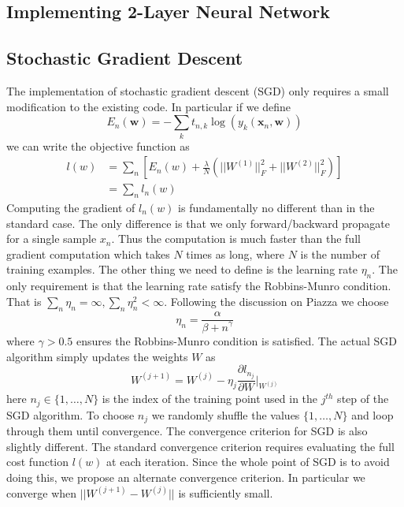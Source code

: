 \documentclass[10pt]{article}
\begin{document}
\subsection*{Implementing 2-Layer Neural Network}

\subsection*{Stochastic Gradient Descent}
The implementation of stochastic gradient descent (SGD) only requires a small modification to the existing code. In particular if we define
%
%
\begin{equation}
E_n(\mathbf{w}) = -\sum_k t_{n,k} \log(y_k(\mathbf{x}_n,\mathbf{w}))
\end{equation}
%
we can write the objective function as 
%
%
\begin{align}
l(w) &= \sum_n \left[ E_n(w) + \frac{\lambda}{N} (||W^{(1)}||^2_F + ||W^{(2)}||^2_F) \right] \\
& = \sum_n l_n(w)
\end{align}
%
%
Computing the gradient of $l_n(w)$ is fundamentally no different than in the standard case. The only difference is that we only forward/backward propagate for a single sample $x_n$. Thus the computation is much faster than the full gradient computation which takes $N$ times as long, where $N$ is the number of training examples. The other thing we need to define is the learning rate $\eta_n$. The only requirement is that the learning rate satisfy the Robbins-Munro condition. That is $\sum_n \eta_n = \infty, \sum_n \eta_n^2 < \infty$. Following the discussion on Piazza we choose
%
%
\begin{equation}
\eta_n = \frac{\alpha}{{\beta + n}^\gamma}
\end{equation}
%
%
where $\gamma > 0.5$ ensures the Robbins-Munro condition is satisfied. The actual SGD algorithm simply updates the weights $W$ as 
%
%
\begin{equation}
W^{(j+1)} = W^{(j)} - \eta_j \frac{\partial l_{n_j}}{\partial W}|_{W^{(j)}}
\end{equation}
%
%
here $n_j \in \{1,\ldots,N\}$ is the index of the training point used in the $j^{th}$ step of the SGD algorithm. To choose $n_j$ we randomly shuffle the values $\{1,\ldots,N\}$ and loop through them until convergence. The convergence criterion for SGD is also slightly different. The standard convergence criterion requires evaluating the full cost function $l(w)$ at each iteration. Since the whole point of SGD is to avoid doing this, we propose an alternate convergence criterion. In particular we converge when $||W^{(j+1)} - W^{(j)}||$ is sufficiently small. 
\end{document}
